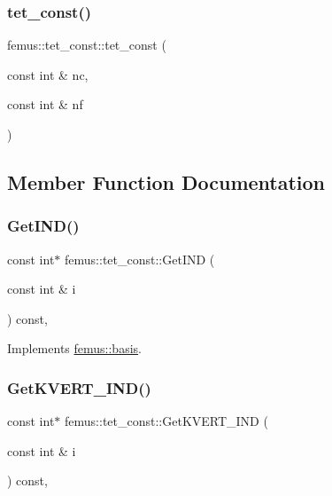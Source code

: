 \subsubsection{\texorpdfstring{tet\+\_\+const()}{tet\_const()}}
{\footnotesize\ttfamily femus\+::tet\+\_\+const\+::tet\+\_\+const (\begin{DoxyParamCaption}\item[{const int \&}]{nc,  }\item[{const int \&}]{nf }\end{DoxyParamCaption})\hspace{0.3cm}{\ttfamily [inline]}}



\subsection{Member Function Documentation}
\mbox{\label{classfemus_1_1tet__const_aa52013fbedd8302be24a2622d45d92a8}} 
\subsubsection{\texorpdfstring{Get\+I\+N\+D()}{GetIND()}}
{\footnotesize\ttfamily const int$\ast$ femus\+::tet\+\_\+const\+::\+Get\+I\+ND (\begin{DoxyParamCaption}\item[{const int \&}]{i }\end{DoxyParamCaption}) const\hspace{0.3cm}{\ttfamily [inline]}, {\ttfamily [virtual]}}



Implements \mbox{\hyperlink{classfemus_1_1basis_a3f63ad97ce70cd4a1196ede69f1f144b}{femus\+::basis}}.

\mbox{\label{classfemus_1_1tet__const_a45c865d95f6a98e297d24d50893942b3}} 
\subsubsection{\texorpdfstring{Get\+K\+V\+E\+R\+T\+\_\+\+I\+N\+D()}{GetKVERT\_IND()}}
{\footnotesize\ttfamily const int$\ast$ femus\+::tet\+\_\+const\+::\+Get\+K\+V\+E\+R\+T\+\_\+\+I\+ND (\begin{DoxyParamCaption}\item[{const int \&}]{i }\end{DoxyParamCaption}) const\hspace{0.3cm}{\ttfamily [inline]}, {\ttfamily [virtual]}}



